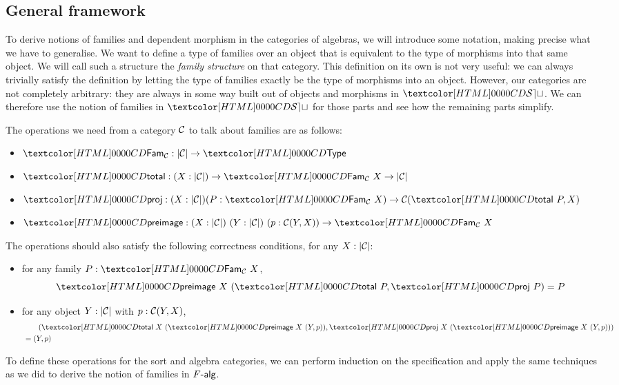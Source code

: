 \subsection{General framework}
\label{general-framework}

To derive notions of families and dependent morphism in the categories
of algebras, we will introduce some notation, making precise what we
have to generalise. We want to define a type of families over an
object that is equivalent to the type of morphisms into that same
object. We will call such a structure the \emph{family structure} on
that category. This definition on its own is not very useful: we can
always trivially satisfy the definition by letting the type of
families exactly be the type of morphisms into an object. However, our
categories are not completely arbitrary: they are always in some way
built out of objects and morphisms in $\SET$. We can therefore use the
notion of families in $\SET$ for those parts and see how the remaining
parts simplify.

\begin{definition}
  The operations we need from a category $\mathcal{C}$ to talk about families
  are as follows:
%
  \begin{itemize}
  \item $\Fam_{\Cc} : | \Cc | \to \Type$
  \item $\total : (X : | \Cc |) \to \Fam_{\Cc}\ X \to | \Cc |$
  \item
    $\proj : (X : | \Cc |) (P : \Fam_{\Cc}\ X) \to \Cc(\total\ P,
    X)$
  \item
    $\preimage : (X : | \Cc |)\ (Y : | \Cc |)\ (p : \Cc(Y,X)) \to
    \Fam_{\Cc}\ X$
  \end{itemize}
%
  The operations should also satisfy the following correctness
  conditions, for any $X : | \mathcal{C} |$:
%
  \begin{itemize}
  \item for any family $P : \Fam_{\Cc}\ X$,
  $$\preimage\ X\ (\total\ P , \proj\ P) = P$$
\item for any object $Y : | \mathcal{C} |$ with $p : \mathcal{C}(Y,X)$,
  \begin{align*}
    &\ \ \ \ \ \ (\total\ X\ (\preimage\ X\ (Y,p)) , \proj\ X\ (\preimage\ X\ (Y,p))) \\
    &= (Y,p)
  \end{align*}
\end{itemize}
%
\end{definition}
To define these operations for the sort and algebra categories, we can
perform induction on the specification and apply the same techniques
as we did to derive the notion of families in $\algcat{F}$.

